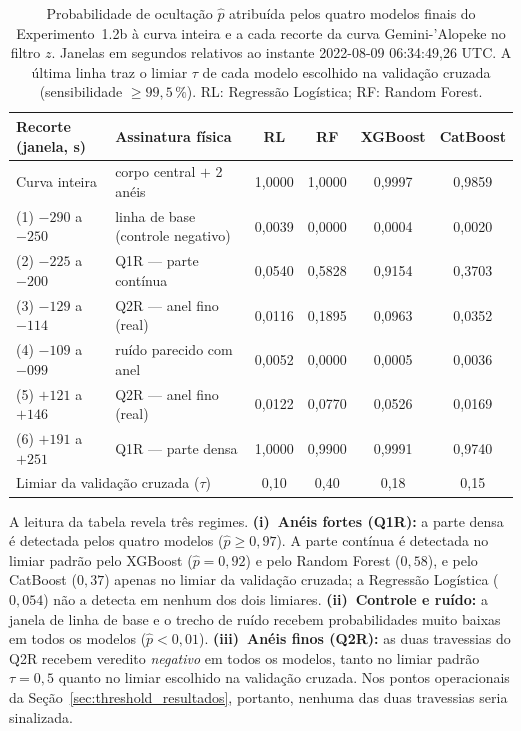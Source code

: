 \begin{table}[htbp]
\centering
\caption{Probabilidade de ocultação $\hat{p}$ atribuída pelos quatro modelos finais do Experimento~1.2b à curva inteira e a cada recorte da curva Gemini-'Alopeke no filtro $z$. Janelas em segundos relativos ao instante 2022-08-09 06:34:49,26 UTC. A última linha traz o limiar $\tau$ de cada modelo escolhido na validação cruzada (sensibilidade $\geq 99{,}5\,\%$). RL: Regressão Logística; RF: Random Forest.}
\label{tab:quaoar_recortes}
\footnotesize
\begin{tabular}{llcccc}
\hline
\textbf{Recorte (janela, s)} & \textbf{Assinatura física} & \textbf{RL} & \textbf{RF} & \textbf{XGBoost} & \textbf{CatBoost} \\
\hline
Curva inteira & corpo central $+$ 2 anéis & 1,0000 & 1,0000 & 0,9997 & 0,9859 \\
\hline
(1) $-290$ a $-250$ & linha de base (controle negativo) & 0,0039 & 0,0000 & 0,0004 & 0,0020 \\
(2) $-225$ a $-200$ & Q1R --- parte contínua            & 0,0540 & 0,5828 & 0,9154 & 0,3703 \\
(3) $-129$ a $-114$ & Q2R --- anel fino (real)          & 0,0116 & 0,1895 & 0,0963 & 0,0352 \\
(4) $-109$ a $-099$ & ruído parecido com anel           & 0,0052 & 0,0000 & 0,0005 & 0,0036 \\
(5) $+121$ a $+146$ & Q2R --- anel fino (real)          & 0,0122 & 0,0770 & 0,0526 & 0,0169 \\
(6) $+191$ a $+251$ & Q1R --- parte densa               & 1,0000 & 0,9900 & 0,9991 & 0,9740 \\
\hline
\multicolumn{2}{l}{Limiar da validação cruzada ($\tau$)} & 0,10 & 0,40 & 0,18 & 0,15 \\
\hline
\end{tabular}
\end{table}

A leitura da tabela revela três regimes. \textbf{(i)~Anéis fortes (Q1R):} a parte densa é detectada pelos quatro modelos ($\hat{p} \geq 0{,}97$). A parte contínua é detectada no limiar padrão pelo XGBoost ($\hat{p}=0{,}92$) e pelo Random Forest ($0{,}58$), e pelo CatBoost ($0{,}37$) apenas no limiar da validação cruzada; a Regressão Logística ($0{,}054$) não a detecta em nenhum dos dois limiares. \textbf{(ii)~Controle e ruído:} a janela de linha de base e o trecho de ruído recebem probabilidades muito baixas em todos os modelos ($\hat{p} < 0{,}01$). \textbf{(iii)~Anéis finos (Q2R):} as duas travessias do Q2R recebem veredito \emph{negativo} em todos os modelos, tanto no limiar padrão $\tau=0{,}5$ quanto no limiar escolhido na validação cruzada. Nos pontos operacionais da Seção~\ref{sec:threshold_resultados}, portanto, nenhuma das duas travessias seria sinalizada.

